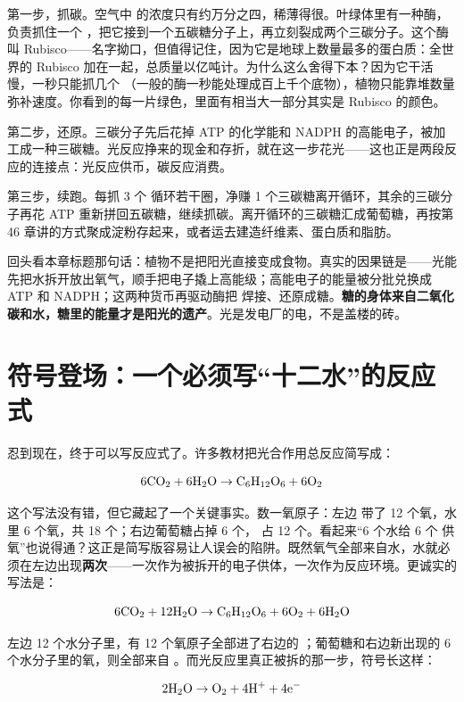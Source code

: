 第一步，抓碳。空气中  的浓度只有约万分之四，稀薄得很。叶绿体里有一种酶，负责抓住一个 ，把它接到一个五碳糖分子上，再立刻裂成两个三碳分子。这个酶叫 Rubisco——名字拗口，但值得记住，因为它是地球上数量最多的蛋白质：全世界的 Rubisco 加在一起，总质量以亿吨计。为什么这么舍得下本？因为它干活慢，一秒只能抓几个 （一般的酶一秒能处理成百上千个底物），植物只能靠堆数量弥补速度。你看到的每一片绿色，里面有相当大一部分其实是 Rubisco 的颜色。

第二步，还原。三碳分子先后花掉 ATP 的化学能和 NADPH 的高能电子，被加工成一种三碳糖。光反应挣来的现金和存折，就在这一步花光——这也正是两段反应的连接点：光反应供币，碳反应消费。

第三步，续跑。每抓 3 个  循环若干圈，净赚 1 个三碳糖离开循环，其余的三碳分子再花 ATP 重新拼回五碳糖，继续抓碳。离开循环的三碳糖汇成葡萄糖，再按第 46 章讲的方式聚成淀粉存起来，或者运去建造纤维素、蛋白质和脂肪。

回头看本章标题那句话：植物不是把阳光直接变成食物。真实的因果链是——光能先把水拆开放出氧气，顺手把电子撬上高能级；高能电子的能量被分批兑换成 ATP 和 NADPH；这两种货币再驱动酶把  焊接、还原成糖。\textbf{糖的身体来自二氧化碳和水，糖里的能量才是阳光的遗产}。光是发电厂的电，不是盖楼的砖。

\section{符号登场：一个必须写“十二水”的反应式}

忍到现在，终于可以写反应式了。许多教材把光合作用总反应简写成：

\[\mathrm{6CO_2} + \mathrm{6H_2O} \rightarrow \mathrm{C_6H_{12}O_6} + \mathrm{6O_2}\]

这个写法没有错，但它藏起了一个关键事实。数一氧原子：左边  带了 12 个氧，水里 6 个氧，共 18 个；右边葡萄糖占掉 6 个， 占 12 个。看起来“6 个水给 6 个  供氧”也说得通？这正是简写版容易让人误会的陷阱。既然氧气全部来自水，水就必须在左边出现\textbf{两次}——一次作为被拆开的电子供体，一次作为反应环境。更诚实的写法是：

\[\mathrm{6CO_2} + \mathrm{12H_2O} \rightarrow \mathrm{C_6H_{12}O_6} + \mathrm{6O_2} + \mathrm{6H_2O}\]

左边 12 个水分子里，有 12 个氧原子全部进了右边的 ；葡萄糖和右边新出现的 6 个水分子里的氧，则全部来自 。而光反应里真正被拆的那一步，符号长这样：

\[\mathrm{2H_2O} \rightarrow \mathrm{O_2} + \mathrm{4H^+} + \mathrm{4e^-}\]

